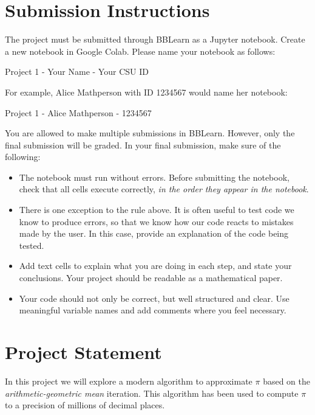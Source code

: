 \documentclass[12pt]{article}
\begin{document}
\sffamily

\section{Submission Instructions}
The project must be submitted through BBLearn as a Jupyter notebook. Create a new notebook in Google Colab. Please name your notebook as follows:

\begin{center}
Project 1 - Your Name - Your CSU ID
\end{center}

For example, Alice Mathperson with ID 1234567 would name her notebook:

\begin{center}
Project 1 - Alice Mathperson - 1234567
\end{center}

You are allowed to make multiple submissions in BBLearn. However, only the final submission will be graded. In your final submission, make sure of the following:

\begin{itemize}
\item The notebook must run without errors. Before submitting the notebook, check that all cells execute correctly, \emph{in the order they appear in the notebook}.
\item There is one exception to the rule above. It is often useful to test code we know to produce errors, so that we know how our code reacts to mistakes made by the user. In this case, provide an explanation of the code being tested.
\item Add text cells to explain what you are doing in each step, and state your conclusions. Your project should be readable as a mathematical paper.
\item Your code should not only be correct, but well structured and clear. Use meaningful variable names and add comments where you feel necessary.
\end{itemize}

\section{Project Statement}
In this project we will explore a modern algorithm to approximate $\pi$ based on the \emph{arithmetic-geometric mean} iteration. This algorithm has been used to compute $\pi$ to a precision of millions of decimal places.
\end{document}
